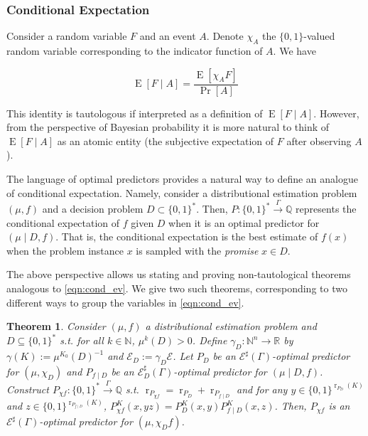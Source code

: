 \documentclass{article}
\numberwithin{equation}{section}
\theoremstyle{definition}
\theoremstyle{plain}
\newtheorem{theorem}{Theorem}[section]
\newcommand{\Bool}{\{0,1\}}
\newcommand{\Words}{{\Bool^*}}
\DeclareMathOperator{\Prb}{Pr}
\DeclareMathOperator{\E}{E}
\DeclareMathOperator{\R}{r}
\newcommand{\Nats}{\mathbb{N}}
\newcommand{\Rats}{\mathbb{Q}}
\newcommand{\Reals}{\mathbb{R}}
\newcommand{\Fall}{\mathcal{E}}
\newcommand{\ESG}{\Fall^\sharp(\Gamma)}
\newcommand{\BoolR}[1]{\Bool^{\R_{#1}(K)}}
\newcommand{\Scheme}{\xrightarrow{\Gamma}}
\begin{document}
\subsubsection{Conditional Expectation}

Consider a random variable $F$ and an event $A$. Denote $\chi_A$ the $\Bool$-valued random variable corresponding to the indicator function of $A$. We have

\begin{equation}
\label{eqn:cond_ev}
\E[F \mid A] = \frac{\E[\chi_A F]}{\Prb[A]}
\end{equation}

This identity is tautologous if interpreted as a definition of $\E[F \mid A]$. However, from the perspective of Bayesian probability it is more natural to think of $\E[F \mid A]$ as an atomic entity (the subjective expectation of $F$ after observing $A$). 

The language of optimal predictors provides a natural way to define an analogue of conditional expectation. Namely, consider a distributional estimation problem $(\mu, f)$ and a decision problem $D \subset \Words$. Then, $P: \Words \Scheme \Rats$ represents the conditional expectation of $f$ given $D$ when it is an optimal predictor for $(\mu \mid D, f)$. That is, the conditional expectation is the best estimate of $f(x)$ when the problem instance $x$ is sampled with the \emph{promise} $x \in D$.

The above perspective allows us stating and proving non-tautological theorems analogous to \ref{eqn:cond_ev}. We give two such theorems, corresponding to two different ways to group the variables in \ref{eqn:cond_ev}.

\begin{samepage}
\begin{theorem}

Consider $(\mu, f)$ a distributional estimation problem and ${D \subseteq \Words}$ s.t. for all $k \in \Nats$, $\mu^k(D) > 0$. Define $\gamma_D: \Nats^n \rightarrow \Reals$ by $\gamma(K):=\mu^{K_0}(D)^{-1}$ and $\Fall_D:=\gamma_D \Fall$. Let $P_D$ be an $\ESG$-optimal predictor for $(\mu, \chi_D)$ and $P_{f \mid D}$ be an $\Fall_D^\sharp(\Gamma)$-optimal predictor for ${(\mu \mid D, f)}$. Construct $P_{\chi f}: \Words \Scheme \Rats$ s.t. $\R_{P_{\chi f}}=\R_{P_D} + \R_{P_{f \mid D}}$ and for any $y \in \BoolR{P_D}$ and $z \in \BoolR{P_{f \mid D}}$, $P_{\chi f}^K(x,yz)=P_D^K(x,y) P_{f \mid D}^K(x,z)$. Then, $P_{\chi f}$ is an $\ESG$-optimal predictor for $(\mu, \chi_Df)$.

\end{theorem}
\end{samepage}
\end{document}
